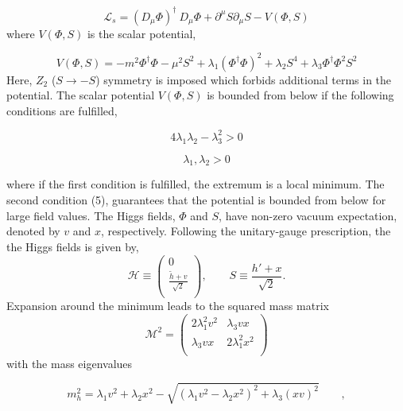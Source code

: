\begin{equation}
 \mathcal{L}_s = (D_{\mu} \Phi )^{\dagger}  \: D_{\mu} \Phi  +  \partial^{\mu}S   \partial_{\mu}S -V(\Phi, S)     \end{equation}
where $V(\Phi, S) $ is the scalar potential,  

\begin{equation}
 V(\Phi, S)= -m^2   \Phi ^{\dagger}\Phi -\mu^2 S^2 +\lambda_1 (\Phi ^{\dagger}\Phi)^2 +\lambda_2 S^4 + \lambda_3 \Phi ^{\dagger}\Phi^2 S^2  \end{equation}
Here, $Z_2$ ($S \rightarrow -S$) symmetry is imposed which forbids additional terms in the potential.
The scalar potential $V(\Phi, S)$ is bounded from below if the following conditions are fulfilled,

\begin{equation}
 4 \lambda_1  \lambda_2 - \lambda_3^2 >0    \end{equation}

\begin{equation}
 \lambda_1 , \lambda_2  >0    \end{equation}

where if the first condition is fulfilled, the extremum is a local minimum. The
second condition (5), guarantees that the potential is bounded from below for large field values.
The Higgs fields, $\Phi$ and $S$, have non-zero vacuum expectation, denoted by $v$ and $x$, respectively.
Following the unitary-gauge prescription, the the Higgs fields is given by,
\newline
$$
{\mathcal H} \equiv \left(
\begin{array}{c}
0  \\
\frac{\tilde{h}+v }{\sqrt{2}}  \\
\end{array}
\right)
, \qquad 
S \equiv \frac{h'+x }{\sqrt{2}}
.
$$
Expansion around the minimum leads to the squared mass matrix
\newline
$$
{\mathcal M}^2 = \left(
\begin{array}{cc}
2 \lambda_1^2 v^2 & \lambda_3 vx  \\
\lambda_3 vx & 2 \lambda_1^2 x^2 \\

\end{array}
\right)
$$
\newline
with the mass eigenvalues

\begin{equation}
 m_h^2=  \lambda_1 v^2 + \lambda_2 x^2 -\sqrt{(\lambda_1 v^2 - \lambda_2 x^2)^2 +\lambda_3 (xv)^2 } \qquad,  \end{equation}

